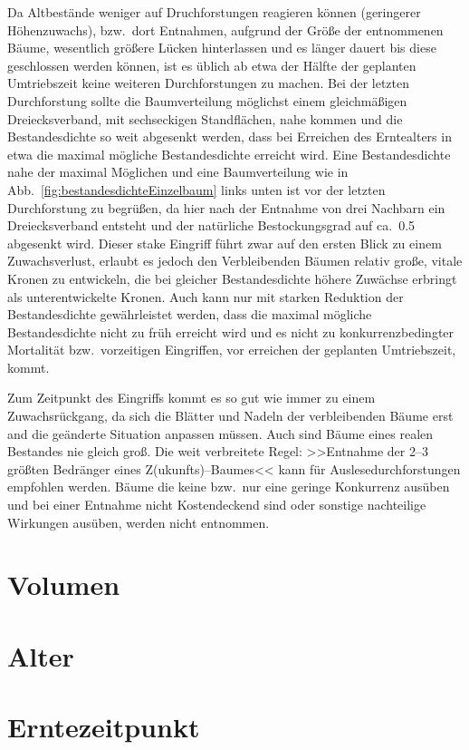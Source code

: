 \documentclass[twocolumn]{scrartcl}
\begin{document}
Da Altbestände weniger auf Druchforstungen reagieren können (geringerer
Höhenzuwachs), bzw.\ dort Entnahmen, aufgrund der Größe der entnommenen Bäume,
wesentlich größere Lücken hinterlassen und es länger dauert bis diese
geschlossen werden können, ist es üblich ab etwa der Hälfte der geplanten
Umtriebszeit keine weiteren Durchforstungen zu machen. Bei der letzten
Durchforstung sollte die Baumverteilung möglichst einem gleichmäßigen
Dreiecksverband, mit sechseckigen Standflächen, nahe kommen und die
Bestandesdichte so weit abgesenkt werden, dass bei Erreichen des Erntealters in
etwa die maximal mögliche Bestandesdichte erreicht wird. Eine Bestandesdichte
nahe der maximal Möglichen und eine Baumverteilung wie in
Abb.~\ref{fig:bestandesdichteEinzelbaum} links unten ist vor der letzten
Durchforstung zu begrüßen, da hier nach der Entnahme von drei Nachbarn ein
Dreiecksverband entsteht und der natürliche Bestockungsgrad auf ca.\ 0.5
abgesenkt wird. Dieser stake Eingriff führt zwar auf den ersten Blick zu einem
Zuwachsverlust, erlaubt es jedoch den Verbleibenden Bäumen relativ große, vitale
Kronen zu entwickeln, die bei gleicher Bestandesdichte höhere Zuwächse erbringt
als unterentwickelte Kronen. Auch kann nur mit starken Reduktion der
Bestandesdichte gewährleistet werden, dass die maximal mögliche Bestandesdichte
nicht zu früh erreicht wird und es nicht zu konkurrenzbedingter Mortalität bzw.\
vorzeitigen Eingriffen, vor erreichen der geplanten Umtriebszeit, kommt.

Zum Zeitpunkt des Eingriffs kommt es so gut wie immer zu einem Zuwachsrückgang,
da sich die Blätter und Nadeln der verbleibenden Bäume erst and die geänderte
Situation anpassen müssen. Auch sind Bäume eines realen Bestandes nie gleich
groß. Die weit verbreitete Regel: >>Entnahme der 2--3 größten Bedränger eines
Z(ukunfts)--Baumes<< kann für Auslesedurchforstungen empfohlen werden. Bäume die
keine bzw.\ nur eine geringe Konkurrenz ausüben und bei einer Entnahme nicht
Kostendeckend sind oder sonstige nachteilige Wirkungen ausüben, werden
nicht entnommen.

\section{Volumen}

\section{Alter}

\section{Erntezeitpunkt}
\end{document}
